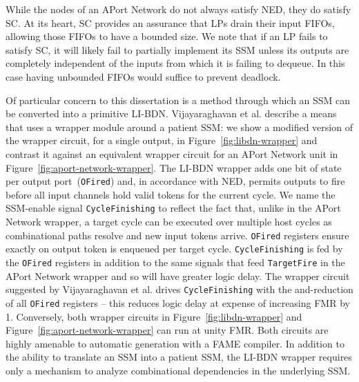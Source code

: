 While the nodes of an APort Network do not always satisfy NED, they do satisfy
SC. At its heart, SC provides an assurance that LPs drain their input FIFOs,
allowing those FIFOs to have a bounded size. We note that if an LP fails to satisfy
SC, it will likely fail to partially implement its SSM unless its outputs are
completely independent of the inputs from which it is failing to dequeue. In
this case having unbounded FIFOs would suffice to prevent deadlock.

Of particular concern to this dissertation is a method through which an SSM can
be converted into a primitive LI-BDN.  Vijayaraghavan et al. describe a means
that uses a wrapper module around a patient SSM: we show a modified version of the wrapper circuit, for a
single output, in Figure~\ref{fig:libdn-wrapper} and contrast it against an equivalent wrapper
circuit for an APort Network unit in Figure~\ref{fig:aport-network-wrapper}.
The LI-BDN wrapper adds one bit of state per output port~(\texttt{OFired}) and, in accordance with NED, permits
outputs to fire before all input channels hold valid tokens for the current cycle. We name the SSM-enable signal \texttt{CycleFinishing}
to reflect the fact that, unlike in the APort Network wrapper, a target cycle can be executed over multiple host cycles
as combinational paths resolve and new input tokens arrive. \texttt{OFired} registers ensure exactly on output
token is enqueued per target cycle. \texttt{CycleFinishing} is fed by the \texttt{OFired} registers in addition to the same signals that feed
\texttt{TargetFire} in the APort Network wrapper and so will have greater logic delay. The wrapper circuit
suggested by Vijayaraghavan et al. drives \texttt{CycleFinishing} with the and-reduction of all \texttt{OFired}
registers -- this reduces logic delay at expense of increasing FMR by 1. Conversely, both wrapper
circuits in Figure~\ref{fig:libdn-wrapper} and Figure~\ref{fig:aport-network-wrapper} can run at unity FMR.
Both circuits are highly amenable to automatic generation with a FAME compiler.
In addition to the ability to translate an SSM into a patient SSM, the LI-BDN wrapper requires
only a mechanism to analyze combinational dependencies in the underlying SSM.

